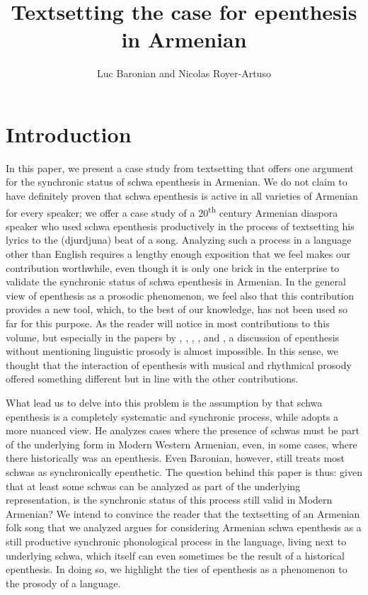 \documentclass[output=paper,colorlinks,citecolor=brown]{langscibook}
\author{Luc Baronian\affiliation{UQAC} and Nicolas Royer-Artuso\affiliation{UQAC/EFMI}}
\title{Textsetting the case for epenthesis in Armenian}
\begin{document}
\maketitle \label{ch12}

\section{Introduction} 
In this paper, we present a case study from textsetting that offers one argument for the synchronic status of schwa epenthesis in Armenian.  We do not claim to have definitely proven that schwa epenthesis is active in all varieties of Armenian for every speaker; we offer a case study of a 20\textsuperscript{th} century Armenian diaspora speaker who used schwa epenthesis productively in the process of textsetting his lyrics to the (djurdjuna) beat of a song.  Analyzing such a process in a language other than English requires a lengthy enough exposition that we feel makes our contribution worthwhile, even though it is only one brick in the enterprise to validate the synchronic status of schwa epenthesis in Armenian.  In the general view of epenthesis as a prosodic phenomenon, we feel also that this contribution provides a new tool, which, to the best of our knowledge, has not been used so far for this purpose.  As the reader will notice in most contributions to this volume, but especially in the papers by , , , ,  and , a discussion of epenthesis without mentioning linguistic prosody is almost impossible.  In this sense, we thought that the interaction of epenthesis with musical and rhythmical prosody offered something different but in line with the other contributions.

What lead us to delve into this problem is the assumption by \citet{Vaux1998} that schwa epenthesis is a completely systematic and synchronic process, while \citet{Baronian2017} adopts a more nuanced view.  He analyzes cases where the presence of schwas must be part of the underlying form in Modern Western Armenian, even, in some cases, where there historically was an epenthesis.  Even Baronian, however, still treats most schwas as synchronically epenthetic.  The question behind this paper is thus: given that at least some schwas can be analyzed as part of the underlying representation, is the synchronic status of this process still valid in Modern Armenian? We intend to convince the reader that the textsetting of an Armenian folk song that we analyzed argues for considering Armenian schwa epenthesis as a still productive synchronic phonological process in the language, living next to underlying schwa, which itself can even sometimes be the result of a historical epenthesis.  In doing so, we highlight the ties of epenthesis as a phenomenon to the prosody of a language.
\end{document}

